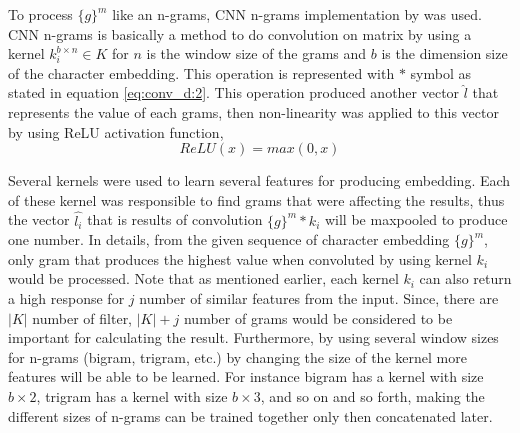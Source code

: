        To process $\{g\}^m$ like an n-grams, CNN n-grams
        implementation by \cite{convolutional2014kim} was used. CNN
        n-grams is basically a method to do convolution on matrix by
        using a kernel $k_i^{b \times n} \in K$ for $n$ is the window
        size of the grams and $b$ is the dimension size of the
        character embedding. This operation is represented with $*$
        symbol as stated in equation \ref{eq:conv_d:2}. This operation
        produced another vector $\hat{l}$ that represents the value of
        each grams, then non-linearity was applied to this vector by
        using ReLU activation function,
        \begin{equation}
            \label{eq:relu}
            ReLU(x) = max(0,x)
        \end{equation}

        Several kernels were used to learn several features for
        producing embedding. Each of these kernel was responsible to
        find grams that were affecting the results, thus the vector
        $\hat{l_i}$ that is results of convolution $\{g\}^m * k_i$
        will be maxpooled to produce one number. In details, from the
        given sequence of character embedding $\{g\}^m$, only gram
        that produces the highest value when convoluted by using
        kernel $k_i$ would be processed. Note that as mentioned
        earlier, each kernel $k_i$ can also return a high response for
        $j$ number of similar features from the input. Since, there
        are $\vert K \vert$ number of filter, $\vert K \vert + j$
        number of grams would be considered to be important for
        calculating the result. Furthermore, by using several window
        sizes for n-grams (bigram, trigram, etc.) by changing the size
        of the kernel more features will be able to be learned. For
        instance bigram has a kernel with size $b \times 2$, trigram
        has a kernel with size $b \times 3$, and so on and so forth,
        making the different sizes of n-grams can be trained together
        only then concatenated later.

